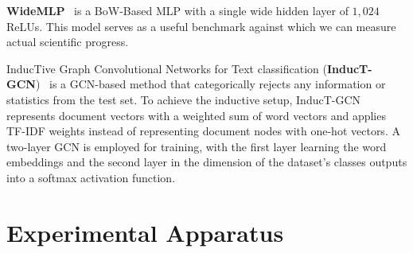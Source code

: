 \documentclass[runningheads]{llncs}
\begin{document}
\textbf{WideMLP}~\cite{galkeMLP} is a \ac{BoW}-Based \ac{MLP} with a single wide hidden layer of $1,024$ \acp{ReLU}. 
This model serves as a useful benchmark against which we can measure actual scientific progress.

InducTive Graph Convolutional Networks for Text classification (\textbf{InducT-GCN})~\cite{wang2022induct} is a \ac{GCN}-based method that categorically rejects any information or statistics from the test set. 
To achieve the inductive setup, InducT-GCN represents document vectors with a weighted sum of word vectors and applies TF-IDF weights instead of representing document nodes with one-hot vectors.
A two-layer GCN is employed for training, with the first layer learning the word embeddings and the second layer in the dimension of the dataset's classes outputs into a softmax activation function. 

\section{Experimental Apparatus}
\label{sec:experiments}
\end{document}
